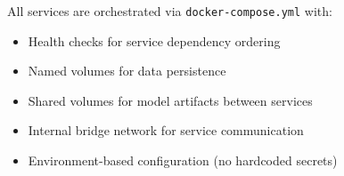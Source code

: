 All services are orchestrated via \texttt{docker-compose.yml} with:

\begin{itemize}
    \item Health checks for service dependency ordering
    \item Named volumes for data persistence
    \item Shared volumes for model artifacts between services
    \item Internal bridge network for service communication
    \item Environment-based configuration (no hardcoded secrets)
\end{itemize}
